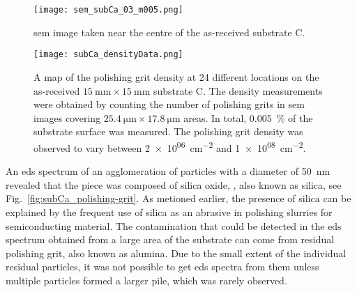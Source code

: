 \begin{figure}[htbp]
    \centering
    \texttt{[image: sem\_subCa\_03\_m005.png]}
    \caption[\Ac{sem} image taken near the centre of the as-received substrate C.]{\Ac{sem} image taken near the centre of the as-received substrate C.}
    \label{fig:subCa_sem_area}
\end{figure}

\begin{figure}[htbp]
    \centering
    \texttt{[image: subCa\_densityData.png]}
    \caption[Map of the polishing grit density on the as-received substrate C.]{A map of the polishing grit density at 24 different locations on the as-received $\SI{15}{\milli\metre}\times\SI{15}{\milli\metre}$ substrate C. The density measurements were obtained by counting the number of polishing grits in \ac{sem} images covering $\SI{25.4}{\micro\metre}\times\SI{17.8}{\micro\metre}$ areas. In total, \SI{0.005}{\percent} of the substrate surface was measured. The polishing grit density was observed to vary between \SI{2e+06}{\centi\metre^{-2}} and \SI{1e+08}{\centi\metre^{-2}}.}
    \label{fig:subCa_densityData}
\end{figure}

An \ac{eds} spectrum of an agglomeration of particles with a diameter of \SI{50}{\nano\metre} revealed that the piece was composed of silica oxide, , also known as silica, see Fig.~\ref{fig:subCa_polishing-grit}. As metioned earlier, the presence of silica can be explained by the frequent use of silica as an abrasive in polishing slurries for semiconducting material. The  contamination that could be detected in the \ac{eds} spectrum obtained from a large area of the substrate can come from residual  polishing grit, also known as alumina. Due to the small extent of the individual residual particles, it was not possible to get \ac{eds} spectra from them unless multiple particles formed a larger pile, which was rarely observed.


